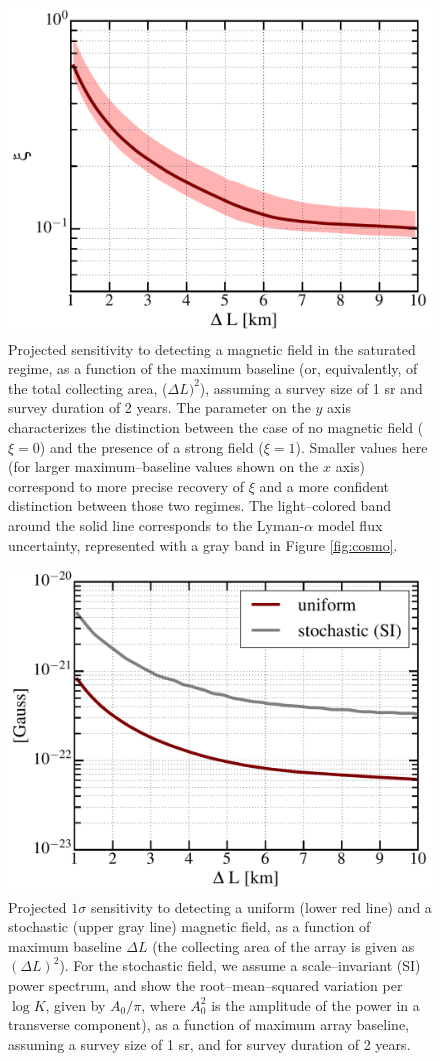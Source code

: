 \begin{figure}
\centering
\includegraphics[width=.35\textwidth,keepaspectratio=true]{xi_vs_deltas.pdf}
\caption{Projected sensitivity to detecting a magnetic field in the saturated regime, as a function of the maximum baseline (or, equivalently, of the total collecting area, ($\Delta L)^2$), assuming a survey size of 1 sr and survey duration of 2 years. The parameter on the $y$ axis characterizes the distinction between the case of no magnetic field ($\xi=0$) and the presence of a strong field ($\xi=1$). Smaller values here (for larger maximum--baseline values shown on the $x$ axis) correspond to more precise recovery of $\xi$ and a more confident distinction between those two regimes. The light--colored band around the solid line corresponds to the Lyman-$\alpha$ model flux uncertainty, represented with a gray band in Figure \ref{fig:cosmo}.\label{fig:xi_vs_deltas}}
\end{figure}
\begin{figure}
\centering
\includegraphics[width=.35\textwidth,keepaspectratio=true]{B_vs_deltas.pdf}
\caption{Projected $1\sigma$ sensitivity to detecting a uniform (lower red line) and a stochastic (upper gray line) magnetic field, as a function of maximum baseline $\Delta L$ (the collecting area of the array is given as $(\Delta L)^2$).  For the stochastic field, we assume a scale--invariant (SI) power spectrum, and show the root--mean--squared variation per $\log K$, given by $A_0/\pi$, where $A_0^2$ is the amplitude of the power in a transverse component), as a function of maximum array baseline, assuming a survey size of 1 sr, and for survey duration of 2 years.\label{fig:B_vs_deltas}}
\end{figure}
